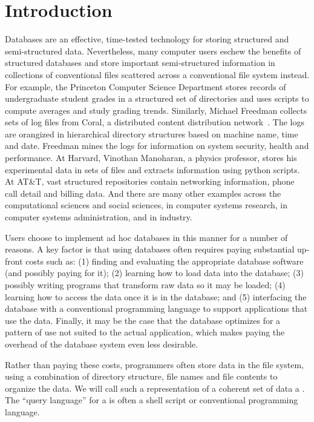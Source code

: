 \section {Introduction}
\label{sec:intro}

Databases are an effective, time-tested technology for storing
structured and semi-structured data.  Nevertheless, many computer
users eschew the benefits of structured databases and store important
semi-structured information in collections of conventional files
scattered across a conventional file system instead.  For example, the
Princeton Computer Science Department
stores records of undergraduate student grades in a structured set of
directories and uses scripts to compute averages and
study grading trends.  Similarly, Michael Freedman collects
sets of log files from Coral, a distributed content distribution
network~\cite{freedman+:coral,freedman:coral-experience}.  
The logs are orangized in hierarchical
directory structures based on machine name, time and date.  Freedman
mines the logs for information on system security, health and performance.  At
Harvard, Vinothan Manoharan, a physics professor, stores 
his experimental data in sets of files and
extracts information using python scripts.  At AT\&T, vast structured
repositories contain networking information,
phone call detail and billing data.  And there are
many other examples across the computational sciences and social
sciences, in computer systems research, in computer
systems administration, and in industry.

Users choose to implement ad hoc databases in this manner for a number
of reasons. A key factor is  that using
databases often requires paying substantial up-front costs such as:
(1) finding and evaluating the appropriate database software (and
possibly paying for it); (2) learning how to load data into the
database; (3) possibly writing programs that transform raw data 
so it may be loaded; (4) learning how
to access the data once it is in the database; and (5) interfacing the
database with a conventional programming language to support
applications that use the data.  Finally, it may be the case that the
database optimizes for a pattern of use not suited to the actual
application, which makes paying the overhead of the database system even
less desirable. 

Rather than paying these costs, programmers often store data in
the file system, using a combination of directory structure, file
names and file contents to organize the data.  We will call such a
representation of a coherent set of data a \textit{\filestore{}}.
The ``query language'' for a \filestore{}
is often a shell script or conventional programming language.

